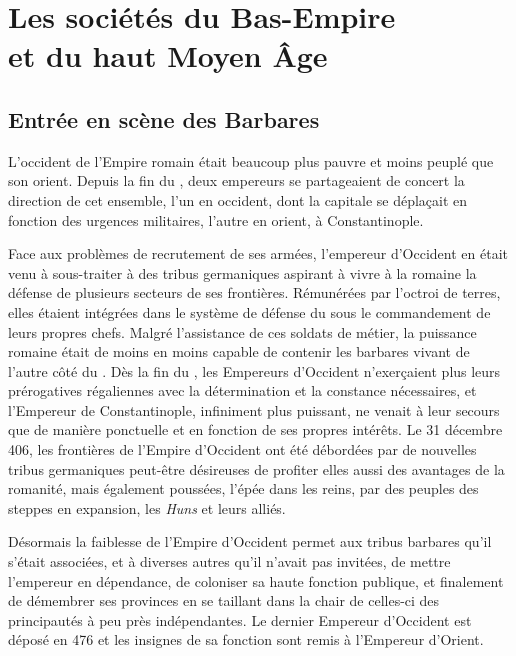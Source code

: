 

\chapter[Les sociétés du Bas-Empire et du haut Moyen Âge]{Les sociétés du Bas-Empire\\et du haut Moyen Âge}

\section{Entrée en scène des Barbares}


 L'occident de l'Empire romain était beaucoup plus pauvre et moins peuplé que son orient. Depuis la fin du , deux empereurs se partageaient de concert la direction de cet ensemble, l'un en occident, dont la capitale se déplaçait en fonction des urgences militaires, l'autre en orient, à Constantinople. 

 Face aux problèmes de recrutement de ses armées, l'empereur d'Occident en était venu à sous-traiter à des tribus germaniques aspirant à vivre à la romaine la défense de plusieurs secteurs de ses frontières. Rémunérées par l'octroi de terres, elles étaient intégrées dans le système de défense du  sous le commandement de leurs propres chefs. Malgré l'assistance de ces soldats de métier, la puissance romaine était de moins en moins capable de contenir les barbares vivant de l'autre côté du . Dès la fin du , les Empereurs d'Occident n'exerçaient plus leurs prérogatives régaliennes avec la détermination et la constance nécessaires, et l'Empereur de Constantinople, infiniment plus puissant, ne venait à leur secours que de manière ponctuelle et en fonction de ses propres intérêts. Le 31 décembre 406, les frontières de l'Empire d'Occident ont été débordées par de nouvelles tribus germaniques peut-être désireuses de profiter elles aussi des avantages de la romanité, mais également poussées, l'épée dans les reins, par des peuples des steppes en expansion, les \emph{Huns} et leurs alliés.

 Désormais la faiblesse de l'Empire d'Occident permet aux tribus barbares qu'il s'était associées, et à diverses autres qu'il n'avait pas invitées, de mettre l'empereur en dépendance, de coloniser sa haute fonction publique, et finalement de démembrer ses provinces en se taillant dans la chair de celles-ci des principautés à peu près indépendantes. Le dernier Empereur d'Occident est déposé en 476 et les insignes de sa fonction sont remis à l'Empereur d'Orient. 

